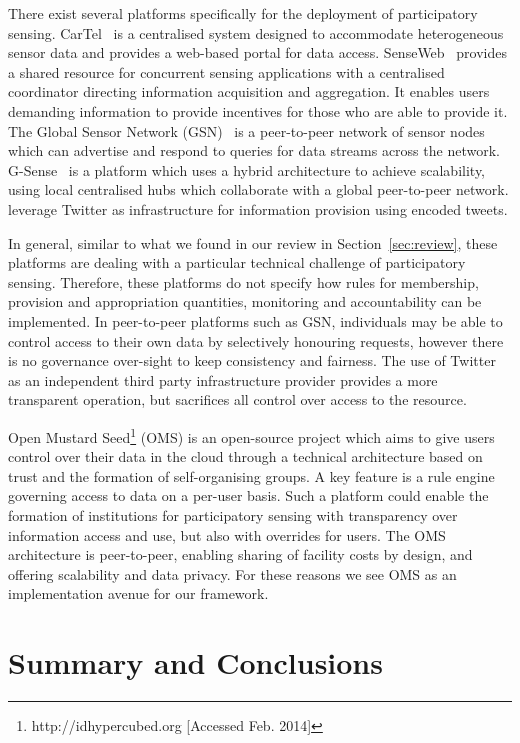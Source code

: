 There exist several platforms specifically for the deployment of participatory sensing. 
CarTel~\citep{Hull2006} is a centralised system designed to accommodate heterogeneous sensor data and provides a web-based portal for data access. 
SenseWeb~\citep{Kansal2007} provides a shared resource for concurrent sensing applications with a centralised coordinator directing information acquisition and aggregation. 
It enables users demanding information to provide incentives for those who are able to provide it. 
The Global Sensor Network (GSN)~\citep{Aberer2006} is a peer-to-peer network of sensor nodes which can advertise and respond to queries for data streams across the network. 
G-Sense~\citep{Perez2010} is a platform which uses a hybrid architecture to achieve scalability, using local centralised hubs which collaborate with a global peer-to-peer network. 
 leverage Twitter as infrastructure for information provision using encoded tweets.

In general, similar to what we found in our review in Section~\ref{sec:review}, these platforms are dealing with a particular technical challenge of participatory sensing. 
Therefore, these platforms do not specify how rules for membership, provision and appropriation quantities, monitoring and accountability can be implemented. 
In peer-to-peer platforms such as GSN, individuals may be able to control access to their own data by selectively honouring requests, however there is no governance over-sight to keep consistency and fairness. 
The use of Twitter as an independent third party infrastructure provider provides a more transparent operation, but sacrifices all control over access to the resource.

Open Mustard Seed\footnote{http://idhypercubed.org [Accessed Feb. 2014]} (OMS) is an open-source project which aims to give users control over their data in the cloud through a technical architecture based on trust and the formation of self-organising groups. 
A key feature is a rule engine governing access to data on a per-user basis. 
Such a platform could enable the formation of institutions for participatory sensing with transparency over information access and use, but also with overrides for users. 
The OMS architecture is peer-to-peer, enabling sharing of facility costs by design, and offering scalability and data privacy. 
For these reasons we see OMS as an implementation avenue for our framework.

\section{Summary and Conclusions}\label{sec:conclude}

